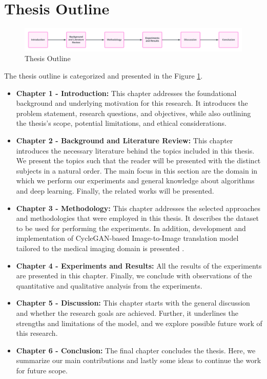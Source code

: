 \documentclass[UKenglish,12pt]{master-style}
\begin{document}
\section{Thesis Outline}

\begin{figure}[ht]
    \centering
    \includegraphics[width=1\textwidth]{Images/Thesis_Outline.png}
    \caption{Thesis Outline}
    \label{fig:Thesis_Outline}
\end{figure}

The thesis outline is categorized and presented in the Figure \ref{fig:Thesis_Outline}.

\begin{itemize}
\item \textbf{Chapter 1 - Introduction:} This chapter addresses the foundational background and underlying motivation for this research.  It introduces the problem statement, research questions, and objectives, while also outlining the thesis's scope, potential limitations, and ethical considerations.

\item \textbf{Chapter 2 - Background and Literature Review:} This chapter introduces the necessary literature behind the topics included in this thesis. We present the topics such that the reader will be presented with the distinct subjects in a natural order. The main focus in this section are the domain in which we perform our experiments and general knowledge about algorithms and deep learning. Finally, the related works will be presented.

\item \textbf{Chapter 3 - Methodology:} This chapter addresses the selected approaches and methodologies that were employed in this thesis.  It describes the dataset to be used for performing the experiments. In addition, development and implementation of CycleGAN-based Image-to-Image translation model tailored to the medical imaging domain is presented .

\item \textbf{Chapter 4 - Experiments and Results:} All the results of the experiments are presented in this chapter. Finally, we conclude with observations of the quantitative and qualitative analysis from the experiments.

\item \textbf{Chapter 5 - Discussion:} This chapter starts with the general discussion and whether the research goals are achieved. Further, it underlines the strengths and limitations of the model, and we explore possible future work of this research.

\item \textbf{Chapter 6 - Conclusion:} The final chapter concludes the thesis. Here, we summarize our main contributions and lastly some ideas to continue the work for future scope.

\end{itemize}
\end{document}
